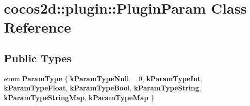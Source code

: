\hypertarget{classcocos2d_1_1plugin_1_1PluginParam}{}\section{cocos2d\+:\+:plugin\+:\+:Plugin\+Param Class Reference}
\label{classcocos2d_1_1plugin_1_1PluginParam}
\subsection*{Public Types}
\begin{DoxyCompactItemize}
\item 
\mbox{\label{classcocos2d_1_1plugin_1_1PluginParam_ac3c3f6b2ac6b5dd3e767dc5b2324ef5b}} 
enum {\bfseries Param\+Type} \{ \newline
{\bfseries k\+Param\+Type\+Null} = 0, 
{\bfseries k\+Param\+Type\+Int}, 
{\bfseries k\+Param\+Type\+Float}, 
{\bfseries k\+Param\+Type\+Bool}, 
\newline
{\bfseries k\+Param\+Type\+String}, 
{\bfseries k\+Param\+Type\+String\+Map}, 
{\bfseries k\+Param\+Type\+Map}
 \}
\end{DoxyCompactItemize}
